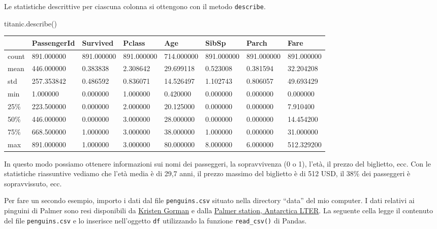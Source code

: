 \documentclass[
  letterpaper,
  krantz2]{{[}./krantz{]}}
\newenvironment{Shaded}{\begin{snugshade}}{\end{snugshade}}
\newcommand{\NormalTok}[1]{\textcolor[rgb]{0.00,0.23,0.31}{#1}}
\begin{document}
Le statistiche descrittive per ciascuna colonna si ottengono con il
metodo \texttt{describe}.

\begin{Shaded}
\begin{Highlighting}[]
\NormalTok{titanic.describe()}
\end{Highlighting}
\end{Shaded}

\begin{longtable}[]{@{}llllllll@{}}
\toprule\noalign{}
& PassengerId & Survived & Pclass & Age & SibSp & Parch & Fare \\
\midrule\noalign{}
\endhead
\bottomrule\noalign{}
\endlastfoot
count & 891.000000 & 891.000000 & 891.000000 & 714.000000 & 891.000000 &
891.000000 & 891.000000 \\
mean & 446.000000 & 0.383838 & 2.308642 & 29.699118 & 0.523008 &
0.381594 & 32.204208 \\
std & 257.353842 & 0.486592 & 0.836071 & 14.526497 & 1.102743 & 0.806057
& 49.693429 \\
min & 1.000000 & 0.000000 & 1.000000 & 0.420000 & 0.000000 & 0.000000 &
0.000000 \\
25\% & 223.500000 & 0.000000 & 2.000000 & 20.125000 & 0.000000 &
0.000000 & 7.910400 \\
50\% & 446.000000 & 0.000000 & 3.000000 & 28.000000 & 0.000000 &
0.000000 & 14.454200 \\
75\% & 668.500000 & 1.000000 & 3.000000 & 38.000000 & 1.000000 &
0.000000 & 31.000000 \\
max & 891.000000 & 1.000000 & 3.000000 & 80.000000 & 8.000000 & 6.000000
& 512.329200 \\
\end{longtable}

In questo modo possiamo ottenere informazioni sui nomi dei passeggeri,
la sopravvivenza (0 o 1), l'età, il prezzo del biglietto, ecc. Con le
statistiche riassuntive vediamo che l'età media è di 29,7 anni, il
prezzo massimo del biglietto è di 512 USD, il 38\% dei passeggeri è
sopravvissuto, ecc.

Per fare un secondo esempio, importo i dati dal file
\texttt{penguins.csv} situato nella directory ``data'' del mio computer.
I dati relativi ai pinguini di Palmer sono resi disponibili da
\href{https://www.uaf.edu/cfos/people/faculty/detail/kristen-gorman.php}{Kristen
Gorman} e dalla \href{https://pallter.marine.rutgers.edu/}{Palmer
station, Antarctica LTER}. La seguente cella legge il contenuto del file
\texttt{penguins.csv} e lo inserisce nell'oggetto \texttt{df}
utilizzando la funzione \texttt{read\_csv()} di Pandas.
\end{document}
